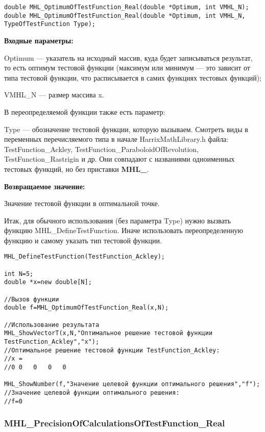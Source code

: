 \documentclass[a4paper,12pt]{article}
\begin{document}
\begin{lstlisting}[label=code_syntax_MHL_OptimumOfTestFunction_Real,caption=Синтаксис]
double MHL_OptimumOfTestFunction_Real(double *Optimum, int VMHL_N);
double MHL_OptimumOfTestFunction_Real(double *Optimum, int VMHL_N, TypeOfTestFunction Type);
\end{lstlisting}

\textbf{Входные параметры:}

Optimum --- указатель на исходный массив, куда будет записываться результат, то есть оптимум тестовой функции (максимум или минимум --- это зависит от типа тестовой функции, что расписывается в самих функциях тестовых функций);

     VMHL\_N --- размер массива x.

В переопределяемой функции также есть параметр:
  
Type --- обозначение тестовой функции, которую вызываем.
Смотреть виды в переменных перечисляемого типа в начале HarrixMathLibrary.h файла: TestFunction\_Ackley, TestFunction\_ParaboloidOfRevolution, TestFunction\_Rastrigin и др. Они совпадают с названиями одноименных тестовых функций, но без приставки \textbf{MHL\_}.

\textbf{Возвращаемое значение:}
 
Значение тестовой функции в оптимальной точке.

Итак, для обычного использования (без параметра Type) нужно вызвать функцию MHL\_DefineTestFunction. Иначе использовать переопределенную функцию и самому указать тип тестовой функции.


\begin{lstlisting}[label=code_use_MHL_OptimumOfTestFunction_Real,caption=Пример использования]
MHL_DefineTestFunction(TestFunction_Ackley);

int N=5;
double *x=new double[N];

//Вызов функции
double f=MHL_OptimumOfTestFunction_Real(x,N);

//Использование результата
MHL_ShowVectorT(x,N,"Оптимальное решение тестовой функции TestFunction_Ackley","x");
//Оптимальное решение тестовой функции TestFunction_Ackley:
//x =	
//0	0	0	0	0

MHL_ShowNumber(f,"Значение целевой функции оптимального решения","f");
//Значение целевой функции оптимального решения:
//f=0
\end{lstlisting}

\subsubsection{MHL\_PrecisionOfCalculationsOfTestFunction\_Real}\label{MHL_PrecisionOfCalculationsOfTestFunction_Real}
\end{document}
